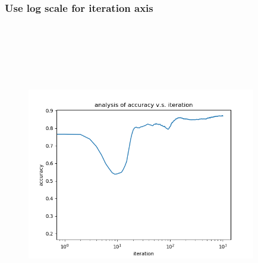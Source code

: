 \documentclass[]{article}
\begin{document}
\begin{CJK*}{UTF8}{bsmi}
\hypertarget{header-n78}{%
\subsubsection{Use log scale for iteration axis}\label{header-n78}}

\begin{figure}
\centering
\includegraphics[width=10cm, height=13.33cm]{ana_log.png}
\caption{}
\end{figure}

\end{CJK*}
\end{document}
